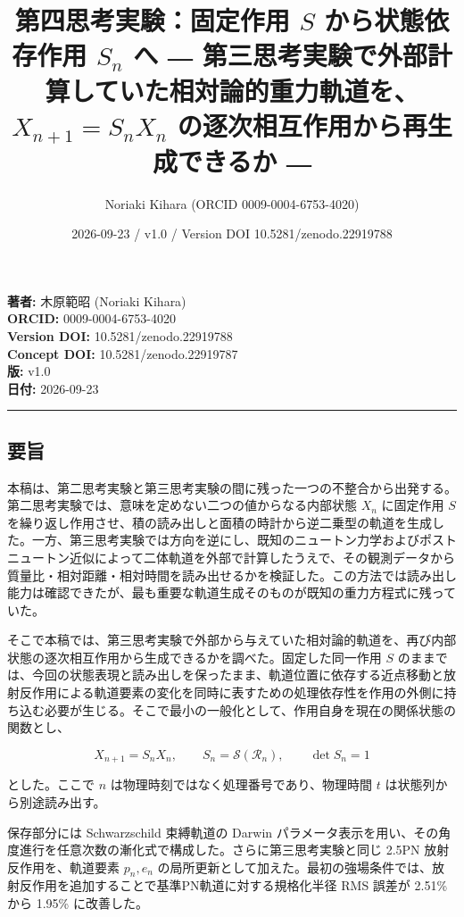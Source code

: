 \documentclass[
  a4paper,
]{ltjsarticle}
\title{第四思考実験：固定作用 \(S\) から状態依存作用 \(S_n\) へ ―
第三思考実験で外部計算していた相対論的重力軌道を、\(X_{n+1}=S_nX_n\)
の逐次相互作用から再生成できるか ―}
\author{Noriaki Kihara (ORCID 0009-0004-6753-4020)}
\date{2026-09-23 / v1.0 / Version DOI 10.5281/zenodo.22919788}
\begin{document}
\maketitle

\textbf{著者:} 木原範昭 (Noriaki Kihara)\\
\textbf{ORCID:} 0009-0004-6753-4020\\
\textbf{Version DOI:} 10.5281/zenodo.22919788\\
\textbf{Concept DOI:} 10.5281/zenodo.22919787\\
\textbf{版:} v1.0\\
\textbf{日付:} 2026-09-23

\begin{center}\rule{0.5\linewidth}{0.5pt}\end{center}

\subsection{要旨}\label{ux8981ux65e8}

本稿は、第二思考実験と第三思考実験の間に残った一つの不整合から出発する。第二思考実験では、意味を定めない二つの値からなる内部状態
\(X_n\) に固定作用 \(S\)
を繰り返し作用させ、積の読み出しと面積の時計から逆二乗型の軌道を生成した。一方、第三思考実験では方向を逆にし、既知のニュートン力学およびポストニュートン近似によって二体軌道を外部で計算したうえで、その観測データから質量比・相対距離・相対時間を読み出せるかを検証した。この方法では読み出し能力は確認できたが、最も重要な軌道生成そのものが既知の重力方程式に残っていた。

そこで本稿では、第三思考実験で外部から与えていた相対論的軌道を、再び内部状態の逐次相互作用から生成できるかを調べた。固定した同一作用
\(S\)
のままでは、今回の状態表現と読み出しを保ったまま、軌道位置に依存する近点移動と放射反作用による軌道要素の変化を同時に表すための処理依存性を作用の外側に持ち込む必要が生じる。そこで最小の一般化として、作用自身を現在の関係状態の関数とし、

\[
X_{n+1}=S_nX_n,
\qquad
S_n=\mathcal S(\mathcal R_n),
\qquad
\det S_n=1
\]

とした。ここで \(n\) は物理時刻ではなく処理番号であり、物理時間 \(t\)
は状態列から別途読み出す。

保存部分には Schwarzschild 束縛軌道の Darwin
パラメータ表示を用い、その角度進行を任意次数の漸化式で構成した。さらに第三思考実験と同じ
2.5PN 放射反作用を、軌道要素 \(p_n,e_n\)
の局所更新として加えた。最初の強場条件では、放射反作用を追加することで基準PN軌道に対する規格化半径
RMS 誤差が 2.51\% から 1.95\% に改善した。
\end{document}
